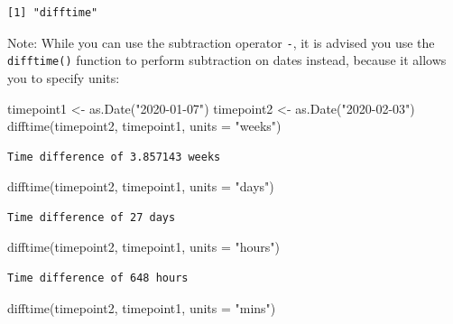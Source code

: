 \documentclass[
]{book}
\newenvironment{Shaded}{\begin{snugshade}}{\end{snugshade}}
\newcommand{\AttributeTok}[1]{\textcolor[rgb]{0.77,0.63,0.00}{#1}}
\newcommand{\FunctionTok}[1]{\textcolor[rgb]{0.00,0.00,0.00}{#1}}
\newcommand{\NormalTok}[1]{#1}
\newcommand{\OtherTok}[1]{\textcolor[rgb]{0.56,0.35,0.01}{#1}}
\newcommand{\StringTok}[1]{\textcolor[rgb]{0.31,0.60,0.02}{#1}}
\begin{document}
\begin{verbatim}
[1] "difftime"
\end{verbatim}

Note: While you can use the subtraction operator \texttt{-}, it is advised you use the \texttt{difftime()} function to perform subtraction on dates instead, because it allows you to specify units:

\begin{Shaded}
\begin{Highlighting}[]
\NormalTok{timepoint1 }\OtherTok{\textless{}{-}} \FunctionTok{as.Date}\NormalTok{(}\StringTok{"2020{-}01{-}07"}\NormalTok{)}
\NormalTok{timepoint2 }\OtherTok{\textless{}{-}} \FunctionTok{as.Date}\NormalTok{(}\StringTok{"2020{-}02{-}03"}\NormalTok{)}
\FunctionTok{difftime}\NormalTok{(timepoint2, timepoint1, }\AttributeTok{units =} \StringTok{"weeks"}\NormalTok{)}
\end{Highlighting}
\end{Shaded}

\begin{verbatim}
Time difference of 3.857143 weeks
\end{verbatim}

\begin{Shaded}
\begin{Highlighting}[]
\FunctionTok{difftime}\NormalTok{(timepoint2, timepoint1, }\AttributeTok{units =} \StringTok{"days"}\NormalTok{)}
\end{Highlighting}
\end{Shaded}

\begin{verbatim}
Time difference of 27 days
\end{verbatim}

\begin{Shaded}
\begin{Highlighting}[]
\FunctionTok{difftime}\NormalTok{(timepoint2, timepoint1, }\AttributeTok{units =} \StringTok{"hours"}\NormalTok{)}
\end{Highlighting}
\end{Shaded}

\begin{verbatim}
Time difference of 648 hours
\end{verbatim}

\begin{Shaded}
\begin{Highlighting}[]
\FunctionTok{difftime}\NormalTok{(timepoint2, timepoint1, }\AttributeTok{units =} \StringTok{"mins"}\NormalTok{)}
\end{Highlighting}
\end{Shaded}
\end{document}
